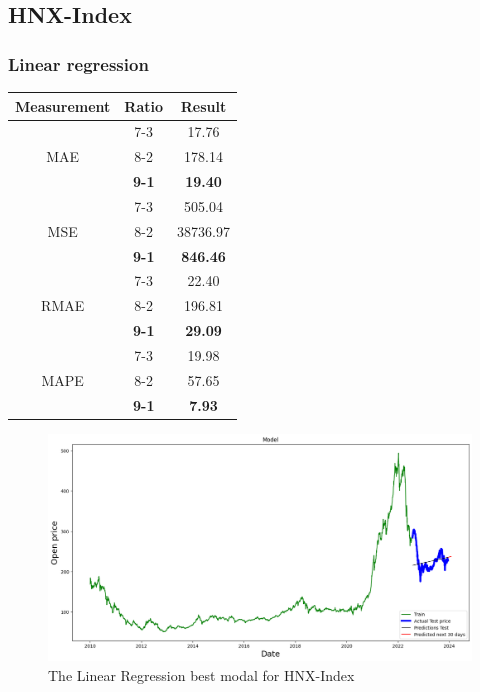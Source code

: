 \documentclass{ieeeojies}
\begin{document}
\subsection{HNX-Index}
\subsubsection{Linear regression}
\begin{table}[H]
    \centering
    \begin{tabular}{|c|c|c|}
        \hline
         Measurement & Ratio &  Result  \\
        \hline
             & 7-3 & 17.76 \\
        MAE  & 8-2 & 178.14 \\
            & \textbf{9-1} & \textbf{19.40} \\
        \hline
           & 7-3 & 505.04  \\
        MSE  & 8-2 & 38736.97 \\
            & \textbf{9-1} &\textbf{ 846.46}  \\
        \hline
           & 7-3 & 22.40 \\
        RMAE  & 8-2 & 196.81  \\
            & \textbf{9-1} & \textbf{29.09} \\
        \hline
           & 7-3 & 19.98  \\
        MAPE  & 8-2 & 57.65  \\
            & \textbf{9-1} &\textbf{ 7.93} \\
        \hline
    \end{tabular}
    \label{table:example}
\end{table}
\begin{figure}[H]
    \centering
    \includegraphics[width=0.8\linewidth]{LINEAR HNX91.jpg}
    \caption{The Linear Regression best modal for HNX-Index}
    \label{fig:example}
\end{figure} 
\end{document}
